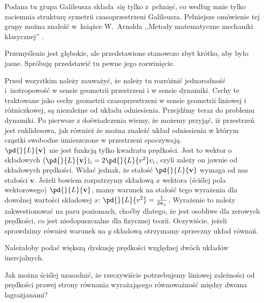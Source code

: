 \documentclass[a4paper,11pt]{article}
\begin{document}
\start {} Podana tu grupa Galileusza składa~się tylko z~pchnięć,
co według mnie tylko zaciemnia strukturę symetrii czasoprzestrzeni
Galileusza. Pełniejsze omówienie tej grupy można znaleźć w~książce
W.~Arnolda ,,Metody matematyczne mechaniki klasycznej''
\cite{ArnoldMetodyMatematyczneMechanikiKlasycznej1981}.

\vspace{\spaceFour}


\start {} Przemyślenie jest głębokie, ale przedstawione
stanowczo zbyt krótko, aby było jasne. Spróbuję przedstawić tu pewne
jego rozwinięcie.

Przed wszystkim należy zauważyć, że należy tu rozróżnić jednorodność
i~izotropowość w sensie geometrii przestrzeni i w sensie dynamiki.
Cechy te traktowane jako cechy geometrii czasoprzestrzeni w sensie
geometrii liniowej i różniczkowej, są niezależne od układu
odniesienia. Przejdźmy teraz do problemu dynamiki. Po pierwsze z
doświadczenia wiemy, że możemy przyjąć, iż przestrzeń jest
euklidesowa, jak również że można znaleźć układ odniesienia w którym
cząstki swobodne umieszczone w przestrzeni spoczywają. \\
\start {} $\pd{}{ L }{ \mathbf{ v } }$ nie jest funkcją tylko
kwadratu prędkości. Jest to wektor o składowych
$( \pd{}{ L }{ \mathbf{ v }} )_{ i } = 2 \pd{}{ L }{ { v^{ 2 } } } v_{
  i }$, czyli zależy on jawnie od składowych prędkości. Widać jednak,
że stałość $\pd{}{ L }{ \mathbf{ v } }$ wymaga od nas stałości
$\mathbf{ v }$. Jeżeli bowiem rozpatrzymy składową $x$ wektora
(ściślej pola wektorowego) $\pd{}{ L }{ \mathbf{ v } }$, mamy warunek
na stałość tego wyrażenia dla dowolnej wartości składowej $x$:
$\pd{}{ L }{ { v^{ 2 } } } = \frac{ 1 }{ 2 \mathbf{ v }_{ x } }$.
Wyrażenie to należy zakwestionować na paru poziomach, choćby dlatego,
że jest osobliwe dla zerowych prędkości, co jest niedopuszczalne dla
fizycznej teorii. Oczywiście, jeżeli sprawdzimy również warunek na
$ y $ składową otrzymamy sprzeczny układ równań.

\vspace{\spaceFour}


\start {} Należałoby podać większą dyskusję prędkości względnej
dwóch układów inercjalnych.

\vspace{\spaceFour}


\start {} Jak można ściślej uzasadnić, że rzeczywiście
potrzebujemy liniowej zależności od prędkości prawej strony równania
wyrażającego równoważność między dwoma lagrażjanami? \Dok
\end{document}
